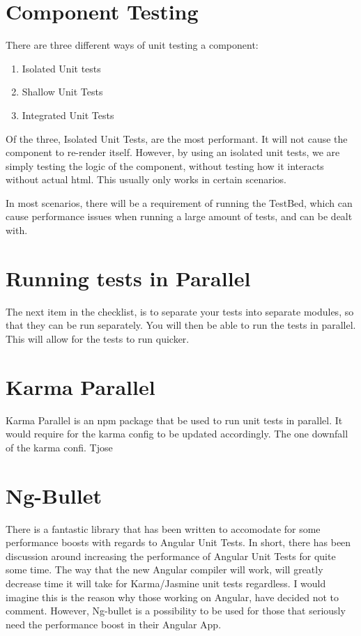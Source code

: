 \section{ Component Testing }
There are three different ways of unit testing a component:
\begin{enumerate}
  \item Isolated Unit tests
  \item Shallow Unit Tests
  \item Integrated Unit Tests
\end{enumerate}

Of the three, Isolated Unit Tests, are the most performant. It will not cause
the component to re-render itself. However, by using an isolated unit tests,
we are simply testing the logic of the component, without testing how it
interacts without actual html. This usually only works in certain scenarios.

In most scenarios, there will be a requirement of running the TestBed, which
can cause performance issues when running a large amount of tests, and can be
dealt with.

\section{ Running tests in Parallel }
The next item in the checklist, is to separate your tests into separate modules,
so that they can be run separately. You will then be able to run the tests in
parallel. This will allow for the tests to run quicker.

\section{ Karma Parallel }
Karma Parallel is an npm package that be used to run unit tests in parallel. It
would require for the karma config to be updated accordingly. The one downfall
of the karma confi. Tjose

\section{ Ng-Bullet }
There is a fantastic library that has been written to accomodate for some
performance boosts with regards to Angular Unit Tests. In short, there has been
discussion around increasing the performance of Angular Unit Tests for quite
some time. The way that the new Angular compiler will work, will greatly
decrease time it will take for Karma/Jasmine unit tests regardless. I would
imagine this is the reason why those working on Angular, have decided not to
comment. However, Ng-bullet is a possibility to be used for those that seriously
need the performance boost in their Angular App.

